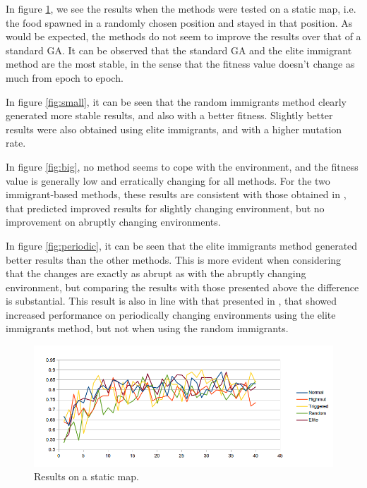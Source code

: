 \documentclass[a4paper,12pt]{article}
\begin{document}
In figure \ref{fig:static}, we see the results when the methods were tested on a static map, i.e. the food spawned in a randomly chosen position and stayed in that position. As would be expected, the methods do not seem to improve the results over that of a standard GA. It can be observed that the standard GA and the elite immigrant method are the most stable, in the sense that the fitness value doesn't change as much from epoch to epoch.

In figure \ref{fig:small}, it can be seen that the random immigrants method clearly generated more stable results, and also with a better fitness. Slightly better results were also obtained using elite immigrants, and with a higher mutation rate. 

In figure \ref{fig:big}, no method seems to cope with the environment, and the fitness value is generally low and erratically changing for all methods. For the two immigrant-based methods, these results are consistent with those obtained in \cite{yang}, that predicted improved results for slightly changing environment, but no improvement on abruptly changing environments.

In figure \ref{fig:periodic}, it can be seen that the elite immigrants method generated better results than the other methods. This is more evident when considering that the changes are exactly as abrupt as with the abruptly changing environment, but comparing the results with those presented above the difference is substantial. This result is also in line with that presented in \cite{yang}, that showed increased performance on periodically changing environments using the elite immigrants method, but not when using the random immigrants.

\begin{figure}[]
\begin{center}
\includegraphics[width=\textwidth]{static.png}
 \caption[]   {Results on a static map.}
\label{fig:static}
\end{center}
\end{figure}
\end{document}

